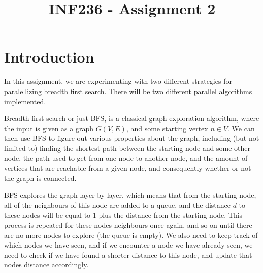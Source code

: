 \documentclass{article}
\title{INF236 - Assignment 2}
\begin{document}
\maketitle
\newpage
\tableofcontents
\newpage
\section{Introduction}
In this assignment, we are experimenting with two different strategies for paralellizing breadth first search. There will be two different parallel algorithms implemented.
\medskip

Breadth first search or just BFS, is a classical graph exploration algorithm, where the input is given as a graph \( G\left( V,E \right) \), and some starting vertex \( n \in V \). We can then use BFS to figure out various properties about the graph, including (but not limited to) finding the shortest path between the starting node and some other node, the path used to get from one node to another node, and the amount of vertices that are reachable from a given node, and consequently whether or not the graph is connected. 
\medskip

BFS explores the graph layer by layer, which means that from the starting node, all of the neighbours of this node are added to a queue, and the distance \( d \) to these nodes will be equal to 1 plus the distance from the starting node. This process is repeated for these nodes neighbours once again, and so on until there are no more nodes to explore (the queue is empty). We also need to keep track of which nodes we have seen, and if we encounter a node we have already seen, we need to check if we have found a shorter distance to this node, and update that nodes distance accordingly.



\newpage
    \timepbfs

\end{document}
